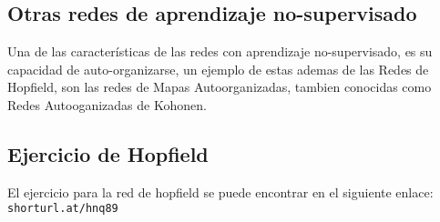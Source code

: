 \documentclass{article}
\begin{document}
\subsection{Otras redes de aprendizaje no-supervisado}
Una de las características de las redes con aprendizaje no-supervisado, es su
capacidad de auto-organizarse, un ejemplo de estas ademas de las Redes de
Hopfield, son las redes de Mapas Autoorganizadas, tambien conocidas como Redes
Autooganizadas de Kohonen.

\subsection{Ejercicio de Hopfield}
El ejercicio para la red de hopfield se puede encontrar en el siguiente enlace:
\texttt{shorturl.at/hnq89}

\newpage
\printbibliography[title={Referencias}]
\end{document}
